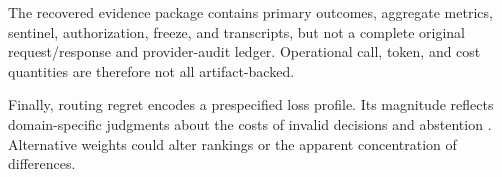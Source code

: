 The recovered evidence package contains primary outcomes, aggregate metrics,
sentinel, authorization, freeze, and transcripts, but not a complete original
request/response and provider-audit ledger.  Operational call, token, and cost
quantities are therefore not all artifact-backed.

Finally, routing regret encodes a prespecified loss profile.  Its magnitude
reflects domain-specific judgments about the costs of invalid decisions and
abstention \citep{Chow1970Reject}.  Alternative weights could alter rankings
or the apparent concentration of differences.
